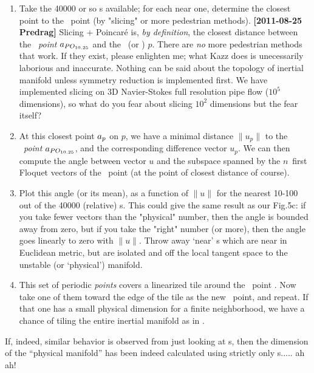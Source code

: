 \begin{description}
\begin{enumerate}
  \item Take the 40000 or so \po s available; for each near one,
  determine the closest point to the \template\ point  (by
  "slicing" or more pedestrian methods).
      {\bf [2011-08-25 Predrag]} Slicing + Poincar\'e is, \emph{by
      definition}, the closest distance between the \emph{\template{}int} $a_{PO_{10.25}}$ and the \po\ (or \rpo) $p$. There are
      \emph{no} more pedestrian methods that work. If they exist, please
      enlighten me; what Kazz does is unecessarily laborious and
      inaccurate. Nothing can be said about the topology of inertial
      manifold unless symmetry reduction is implemented first. We have
      implemented slicing on 3D Navier-Stokes full resolution pipe flow
      ($10^5$ dimensions), so what do you fear about slicing $10^2$
      dimensions but the fear itself?


  \item At this closest point $a_p$ on {\po} $p$, we have a minimal
  distance $\|u_p\|$ to the \emph{\template\ point} $a_{PO_{10.25}}$,
  and the corresponding difference vector $u_p$. We can then compute the
  angle between vector $u$ and the subspace spanned by the $n$~first
  Floquet vectors of the \template\ point  \PO{10.25} (at the point of
  closest distance of course).

  \item Plot this angle (or its mean), as a function of $\|u\|$ for the
  nearest 10-100 out of the 40000 (relative) \po s. This could give the
  same result as our Fig.5c: if you take fewer vectors than the
  "physical" number, then the angle is bounded away from zero, but if you
  take the "right" number (or more), then the angle goes linearly to zero
  with $\|u\|$. Throw away `near' \po s which are near in Euclidean
  metric, but are isolated and off the local tangent space to the
  unstable (or `physical') manifold.

  \item This set of periodic \emph{points} covers a linearized tile
  around the \template\ point \PO{10.25}. Now take one of them toward the
  edge of the tile as the new \template\ point, and repeat. If that one
  has a small physical dimension for a finite neighborhood, we have a
  chance of tiling the entire inertial manifold as in
  .
\end{enumerate}
If, indeed, similar behavior is observed from just looking at \po s, then
the dimension of the ``physical manifold'' has been indeed calculated
using strictly only \po s.....  ah ah!


\end{description}
